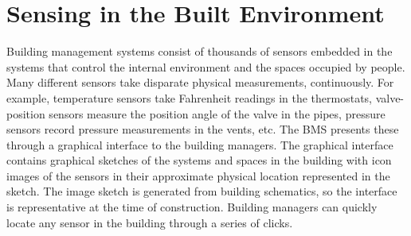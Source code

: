 \chapter{Sensing in the Built Environment}
\label{chap:SensingInBuiltMain}


Building management systems consist of thousands of sensors embedded in the systems that control the internal environment and
the spaces occupied by people.  Many different sensors take disparate physical measurements, continuously.
For example, temperature sensors take Fahrenheit readings in the thermostats,
valve-position sensors measure the position angle of the valve in the pipes, pressure sensors record pressure measurements in the vents, 
etc.
The BMS presents these through a graphical interface to the building managers.  The graphical interface contains graphical sketches
of the systems and spaces in the building with icon images of the sensors in their approximate physical location represented
in the sketch.  The image sketch is generated from building schematics, so the interface is representative at the time of construction.
Building managers can quickly locate any sensor in the building through a series of clicks.


